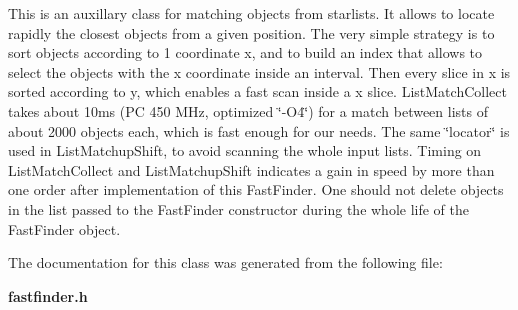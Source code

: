 This is an auxillary class for matching objects from starlists. It allows to locate rapidly the closest objects from a given position. The very simple strategy is to sort objects according to 1 coordinate x, and to build an index that allows to select the objects with the x coordinate inside an interval. Then every slice in x is sorted according to y, which enables  a fast scan inside a x slice. List\-Match\-Collect takes about 10ms (PC 450 MHz, optimized \char`\"{}-O4\char`\"{})  for a match between lists of about 2000 objects each, which is fast enough for our needs. The same \char`\"{}locator\char`\"{} is used in List\-Matchup\-Shift, to avoid scanning the whole input lists. Timing on List\-Match\-Collect and List\-Matchup\-Shift indicates a gain in speed by more than one order after implementation of this Fast\-Finder. One should not delete objects in the list passed to the  Fast\-Finder constructor during the whole life of the Fast\-Finder object. 



The documentation for this class was generated from the following file:\begin{CompactItemize}
\item 
{\bf fastfinder.h}\end{CompactItemize}
